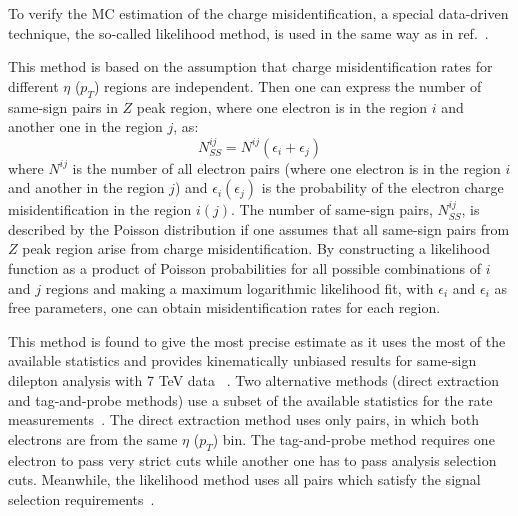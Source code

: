 To verify the MC estimation of the charge misidentification, a special data-driven technique, the so-called likelihood method, 
is used in the same way as in ref.~\cite{same_sign_paper_7tev}.


This method is based on the assumption that charge misidentification rates for different $\eta$ ($p_T$) regions are independent.
Then one can express the number of same-sign pairs in $Z$ peak region, where one electron is in the region $i$ and another one in the region $j$, as:
\begin{equation}
 N_{SS}^{ij} = N^{ij}(\epsilon_i+\epsilon_j)
\end{equation}
where $N^{ij}$ is the number of all electron pairs (where one electron is in the region $i$ and another in the region $j$) and $\epsilon_i (\epsilon_j)$ is the probability of the electron charge misidentification in the region $i (j)$. The number of same-sign pairs, $N_{SS}^{ij}$, is described by the Poisson distribution if one assumes that all same-sign pairs from $Z$ peak region arise from charge misidentification. 
By constructing a likelihood function as a product of Poisson probabilities for all possible combinations of $i$ and $j$ regions and making a maximum logarithmic likelihood fit, with $\epsilon_i$ and $\epsilon_i$ as free parameters, one can obtain misidentification rates for each region.

This method is found to give the most precise estimate as it uses the most of the available statistics and provides kinematically unbiased results
for same-sign dilepton analysis with 7 TeV data ~\cite{anthony_thesis}.
Two alternative methods (direct extraction and tag-and-probe methods)
use a subset of the available statistics for the rate measurements~\cite{cf_top_paper}.
The direct extraction method uses only pairs, in which both electrons are from the same $\eta$ ($p_T$) bin. The tag-and-probe method requires one electron to pass very strict cuts while another one has to pass analysis selection cuts. Meanwhile, the likelihood method uses all pairs which satisfy the signal selection requirements~\cite{alonso_thesis}.

